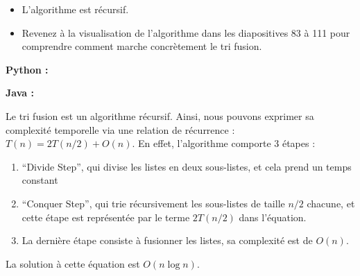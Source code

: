 \begin{Exercice} [30 minutes]
    \begin{conseil}
    \begin{itemize}
        \item L'algorithme est récursif. 
        \item Revenez à la visualisation de l'algorithme dans les diapositives 83 à 111 pour comprendre comment marche concrètement le tri fusion. 
    \end{itemize}
    
    \end{conseil}
    
    \begin{solution}
        \textbf{Python :}
         
    \end{solution}
    \begin{solution}
        \textbf{Java :}
        
    \end{solution}
    \begin{solution}
        
        
        Le tri fusion est un algorithme récursif. Ainsi, nous pouvons exprimer sa complexité temporelle via une relation de récurrence : $T(n) = 2T(n/2) + O(n)$. En effet, l'algorithme comporte 3 étapes :
        \begin{enumerate}
            \item ``Divide Step'', qui divise les listes en deux sous-listes, et cela prend un temps constant
            \item ``Conquer Step'', qui trie récursivement les sous-listes de taille $n/2$ chacune, et cette étape est représentée par le terme $2T(n/2)$ dans l'équation.
            \item La dernière étape consiste à fusionner les listes, sa complexité est de $O(n)$.
        \end{enumerate}
        La solution à cette équation est $O(n \log n)$.
    \end{solution}
\end{Exercice}



